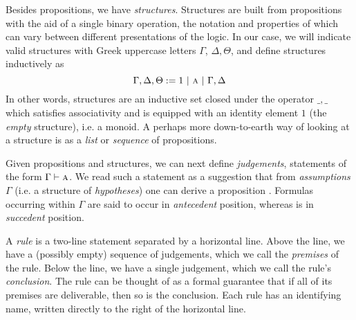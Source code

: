 Besides propositions, we have \textit{structures}. 
Structures are built from propositions with the aid of a single binary operation, the notation and properties of which can vary between different presentations of the logic.
In our case, we will indicate valid structures with Greek uppercase letters $\Gamma$, $\Delta, \Theta$, and define structures inductively as 
\begin{equation}
	\Gamma, \Delta, \Theta := 1 \ | \ \prop{a} \ | \ \Gamma, \Delta
\end{equation}
In other words, structures are an inductive set closed under the operator $\_,\_$ which satisfies associativity and is equipped with an identity element $1$ (the \textit{empty} structure), i.e. a monoid.
A perhaps more down-to-earth way of looking at a structure is as a \textit{list} or \textit{sequence} of propositions.

Given propositions and structures, we can next define \textit{judgements}, statements of the form
$\Gamma \vdash \prop{a}$.
We read such a statement as a suggestion that from \textit{assumptions} $\Gamma$ (i.e. a structure of \textit{hypotheses}) one can derive a proposition .
Formulas occurring within $\Gamma$ are said to occur in \textit{antecedent} position, whereas  is in \textit{succedent} position.

A \textit{rule} is a two-line statement separated by a horizontal line.
Above the line, we have a (possibly empty) sequence of judgements, which we call the \textit{premises} of the rule.
Below the line, we have a single judgement, which we call the rule's \textit{conclusion}.
The rule can be thought of as a formal guarantee that if all of its premises are deliverable, then so is the conclusion.
Each rule has an identifying name, written directly to the right of the horizontal line.

